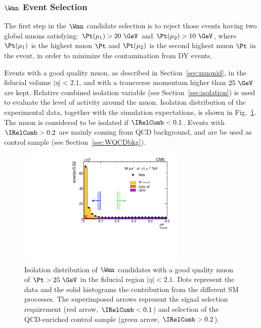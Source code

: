 \subsubsection{$\Wmn$ Event Selection}
\label{sec:WmnSel}


The first step in the $\Wmn$ candidate selection is to
reject those events having two global muons satisfying: $\Pt(\mu_1) >
20~\GeV$ and $\Pt(\mu_2) > 10~\GeV$, where $\Pt(\mu_1)$ is the
highest muon $\Pt$ and $ \Pt(\mu_2)$ is the second highest muon $\Pt$
in the event, in order to minimize the contamination from DY
events.

Events with a good quality muon, as described in Section~\ref{sec:muonid},
in the fiducial volume $|\eta|<2.1$, and with a transverse momentum
higher than $25~\GeV$ are kept.
Relative combined isolation variable (see Section~\ref{sec:isolation}) is used to evaluate the level of activity around the
muon. Isolation distribution of the experimental data, together with the simulation expectations, is shown in
Fig.~\ref{figure:Wmunu_iso}. The muon is considered to be isolated if $\IRelComb < 0.1$.
Events with $\IRelComb > 0.2$ are mainly coming from QCD background, and are be used as 
control sample (see Section~\ref{sec:WQCDbkg}).

\begin{figure}[htb] {\centering
    \includegraphics[width=8cm]{figs/Wmunu_isolation.pdf}
    \caption{Isolation distribution of $\Wmn$ candidates with a good quality muon of $\Pt>25~\GeV$ in the fiducial region $|\eta|<2.1$.
Dots represent the data and the solid histograms the contribution from the different SM processes.
The superimposed arrows represent the signal selection requirement (red
arrow, $\IRelComb<0.1$) and selection of the QCD-enriched
control sample (green arrow, $\IRelComb>0.2$).
}
    \label{figure:Wmunu_iso}}
\end{figure}


